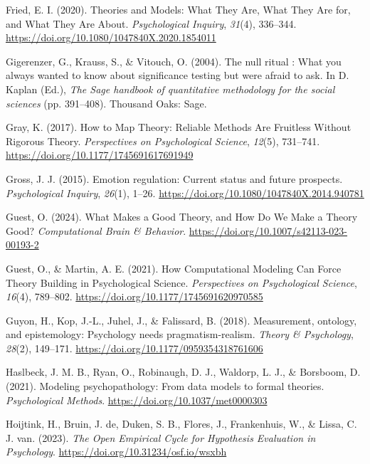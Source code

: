 \documentclass[
  man, noextraspace,floatsintext]{apa6}
\newlength{\cslhangindent}
\newenvironment{CSLReferences}[2] %
 {\begin{list}{}{%
  \setlength{\itemindent}{0pt}
  \setlength{\leftmargin}{0pt}
  \setlength{\parsep}{0pt}
  \ifodd #1
   \setlength{\leftmargin}{\cslhangindent}
   \setlength{\itemindent}{-1\cslhangindent}
  \fi
  \setlength{\itemsep}{#2\baselineskip}}}
 {\end{list}}
\begin{document}
\begin{CSLReferences}{1}{0}
Fried, E. I. (2020). Theories and {Models}: {What They Are}, {What They Are} for, and {What They Are About}. \emph{Psychological Inquiry}, \emph{31}(4), 336--344. \url{https://doi.org/10.1080/1047840X.2020.1854011}

Gigerenzer, G., Krauss, S., \& Vitouch, O. (2004). The null ritual : {What} you always wanted to know about significance testing but were afraid to ask. In D. Kaplan (Ed.), \emph{The {Sage} handbook of quantitative methodology for the social sciences} (pp. 391--408). Thousand Oaks: Sage.

Gray, K. (2017). How to {Map Theory}: {Reliable Methods Are Fruitless Without Rigorous Theory}. \emph{Perspectives on Psychological Science}, \emph{12}(5), 731--741. \url{https://doi.org/10.1177/1745691617691949}

Gross, J. J. (2015). Emotion regulation: {Current} status and future prospects. \emph{Psychological Inquiry}, \emph{26}(1), 1--26. \url{https://doi.org/10.1080/1047840X.2014.940781}

Guest, O. (2024). What {Makes} a {Good Theory}, and {How Do We Make} a {Theory Good}? \emph{Computational Brain \& Behavior}. \url{https://doi.org/10.1007/s42113-023-00193-2}

Guest, O., \& Martin, A. E. (2021). How {Computational Modeling Can Force Theory Building} in {Psychological Science}. \emph{Perspectives on Psychological Science}, \emph{16}(4), 789--802. \url{https://doi.org/10.1177/1745691620970585}

Guyon, H., Kop, J.-L., Juhel, J., \& Falissard, B. (2018). Measurement, ontology, and epistemology: {Psychology} needs pragmatism-realism. \emph{Theory \& Psychology}, \emph{28}(2), 149--171. \url{https://doi.org/10.1177/0959354318761606}

Haslbeck, J. M. B., Ryan, O., Robinaugh, D. J., Waldorp, L. J., \& Borsboom, D. (2021). Modeling psychopathology: {From} data models to formal theories. \emph{Psychological Methods}. \url{https://doi.org/10.1037/met0000303}

Hoijtink, H., Bruin, J. de, Duken, S. B., Flores, J., Frankenhuis, W., \& Lissa, C. J. van. (2023). \emph{The {Open Empirical Cycle} for {Hypothesis Evaluation} in {Psychology}}. \url{https://doi.org/10.31234/osf.io/wsxbh}


\end{CSLReferences}
\end{document}
